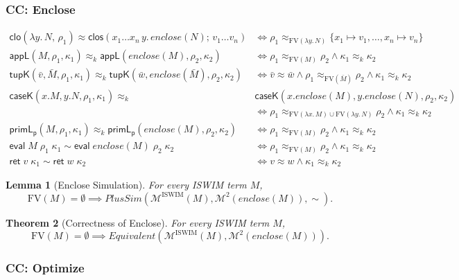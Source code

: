\documentclass[10pt]{article}
\theoremstyle{acmplain}
\newtheorem{theorem}{Theorem}[section]
\newtheorem{lemma}[theorem]{Lemma}
\newcommand{\key}[1]{\mathsf{#1}}
\newcommand{\pass}[1]{\mathit{#1}}
\newcommand{\lam}[1]{\lambda #1.\,}
\newcommand{\FV}{\mathrm{FV}}
\newcommand{\ev}[3]{\key{eval}\;#1\;#2\;#3}
\newcommand{\rt}[2]{\key{ret}\;#1\;#2}
\newcommand{\Mach}[1]{\mathcal{M}^{#1}}
\newcommand{\Equiv}{\mathit{Equivalent}}
\newcommand{\cloV}[2]{\key{clo}(#1,\, #2)}
\newcommand{\closV}[2]{\key{clos}(#1;\, #2)}
\newcommand{\Kf}[2]{\key{#1}(#2)}
\newcommand{\approxk}{\approx_k}
\begin{document}
\subsubsection{CC: Enclose}\label{sec:sim-enclose}

\begin{align*}
  \cloV{\lam{y} N}{\rho_1} \approx \closV{x_1 \ldots x_n\, y.\, \pass{enclose}(N)}{v_1 \ldots v_n}
    &\iff \rho_1 \approx_{\FV(\lam{y} N)} \{x_1 {\mapsto} v_1, \ldots, x_n {\mapsto} v_n\} \\[1ex]
  \Kf{appL}{M, \rho_1, \kappa_1} \approxk \Kf{appL}{\pass{enclose}(M), \rho_2, \kappa_2}
    &\iff \rho_1 \approx_{\FV(M)} \rho_2 \land \kappa_1 \approxk \kappa_2 \\
  \Kf{tupK}{\bar{v}, \bar{M}, \rho_1, \kappa_1} \approxk \Kf{tupK}{\bar{w}, \pass{enclose}(\bar{M}), \rho_2, \kappa_2}
    &\iff \bar{v} \approx \bar{w} \land \rho_1 \approx_{\FV(\bar{M})} \rho_2 \land \kappa_1 \approxk \kappa_2 \\
  \Kf{caseK}{x.M, y.N, \rho_1, \kappa_1} \approxk {}&
    \Kf{caseK}{x.\pass{enclose}(M), y.\pass{enclose}(N), \rho_2, \kappa_2} \\
    &\iff \rho_1 \approx_{\FV(\lam{x} M) \cup \FV(\lam{y} N)} \rho_2 \land \kappa_1 \approxk \kappa_2 \\
  \Kf{primL_p}{M, \rho_1, \kappa_1} \approxk \Kf{primL_p}{\pass{enclose}(M), \rho_2, \kappa_2}
    &\iff \rho_1 \approx_{\FV(M)} \rho_2 \land \kappa_1 \approxk \kappa_2 \\[1ex]
  \ev{M}{\rho_1}{\kappa_1} \sim \ev{\pass{enclose}(M)}{\rho_2}{\kappa_2}
    &\iff \rho_1 \approx_{\FV(M)} \rho_2 \land \kappa_1 \approxk \kappa_2 \\
  \rt{v}{\kappa_1} \sim \rt{w}{\kappa_2} &\iff v \approx w \land \kappa_1 \approxk \kappa_2
\end{align*}

\begin{lemma}[Enclose Simulation]\label{lem:enclose-fsim}
For every ISWIM term $M$,
\[
  \FV(M) = \emptyset \implies
  \mathit{PlusSim}(\Mach{\mathrm{ISWIM}}(M), \Mach{2}(\pass{enclose}(M)), \sim) .
\]
\end{lemma}

\begin{theorem}[Correctness of Enclose]\label{thm:enclose-correct}
For every ISWIM term $M$,
\[
  \FV(M) = \emptyset \implies
  \Equiv(\Mach{\mathrm{ISWIM}}(M), \Mach{2}(\pass{enclose}(M))) .
\]
\end{theorem}

\subsubsection{CC: Optimize}\label{sec:sim-optimize}
\end{document}
